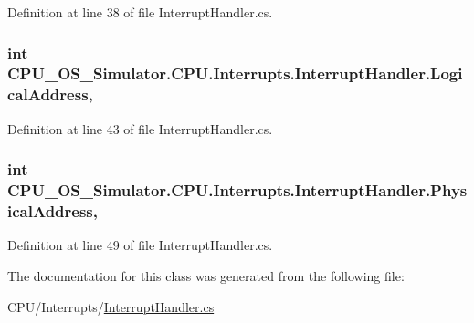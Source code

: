 Definition at line 38 of file Interrupt\+Handler.\+cs.

\hypertarget{class_c_p_u___o_s___simulator_1_1_c_p_u_1_1_interrupts_1_1_interrupt_handler_a4eb5f999c92ce0e432f8d997e4d7b32f}{}
\subsubsection[{Logical\+Address}]{\setlength{\rightskip}{0pt plus 5cm}int C\+P\+U\+\_\+\+O\+S\+\_\+\+Simulator.\+C\+P\+U.\+Interrupts.\+Interrupt\+Handler.\+Logical\+Address\hspace{0.3cm}{\ttfamily [get]}, {\ttfamily [set]}}\label{class_c_p_u___o_s___simulator_1_1_c_p_u_1_1_interrupts_1_1_interrupt_handler_a4eb5f999c92ce0e432f8d997e4d7b32f}


Definition at line 43 of file Interrupt\+Handler.\+cs.

\hypertarget{class_c_p_u___o_s___simulator_1_1_c_p_u_1_1_interrupts_1_1_interrupt_handler_a5e291375ce7055c170c2f0fe309f4bb5}{}
\subsubsection[{Physical\+Address}]{\setlength{\rightskip}{0pt plus 5cm}int C\+P\+U\+\_\+\+O\+S\+\_\+\+Simulator.\+C\+P\+U.\+Interrupts.\+Interrupt\+Handler.\+Physical\+Address\hspace{0.3cm}{\ttfamily [get]}, {\ttfamily [set]}}\label{class_c_p_u___o_s___simulator_1_1_c_p_u_1_1_interrupts_1_1_interrupt_handler_a5e291375ce7055c170c2f0fe309f4bb5}


Definition at line 49 of file Interrupt\+Handler.\+cs.



The documentation for this class was generated from the following file\+:\begin{DoxyCompactItemize}
\item 
C\+P\+U/\+Interrupts/\hyperlink{_interrupt_handler_8cs}{Interrupt\+Handler.\+cs}\end{DoxyCompactItemize}
